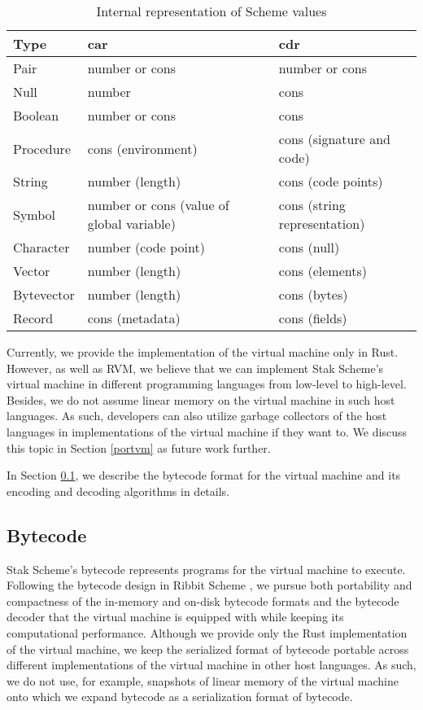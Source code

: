 \documentclass[sigplan]{acmart}
\begin{document}
\begin{table*}
  \begin{center}
    \begin{tabular}{lll}
      \hline
      Type & car & cdr \\
      \hline
      Pair & number or cons & number or cons \\
      Null & number & cons \\
      Boolean & number or cons & cons \\
      Procedure & cons (environment) & cons (signature and code) \\
      String & number (length) & cons (code points) \\
      Symbol & number or cons (value of global variable) & cons
      (string representation) \\
      Character & number (code point) & cons (null) \\
      Vector & number (length) & cons (elements) \\
      Bytevector & number (length) & cons (bytes) \\
      Record & cons (metadata) & cons (fields) \\
      \hline
    \end{tabular}

    \caption{Internal representation of Scheme values}
    \label{table:types}
  \end{center}
\end{table*}

Currently, we provide the implementation of the virtual machine only
in Rust.
However, as well as RVM, we believe that we can implement Stak Scheme's
virtual machine in different programming languages from low-level to high-level.
Besides, we do not assume linear memory on the virtual machine in such
host languages.
As such, developers can also utilize garbage collectors of
the host languages in implementations of the virtual machine if they want to.
We discuss this topic in Section \ref{portvm} as future work further.

In Section \ref{bytecode}, we describe the bytecode format for the
virtual machine and its encoding and decoding algorithms in details.

\subsection{Bytecode} \label{bytecode}

Stak Scheme's bytecode represents programs for the virtual machine to execute.
Following the bytecode design in Ribbit Scheme \cite{ribbit2023}, we pursue both
portability and compactness of the in-memory and on-disk bytecode
formats and the bytecode decoder that the virtual machine is
equipped with while keeping its computational performance.
Although we provide only the Rust implementation of the virtual machine,
we keep the serialized format of bytecode portable across
different implementations of the virtual machine in other host languages.
As such, we do not use, for example, snapshots of linear
memory of the virtual machine onto which we expand bytecode as a
serialization format of bytecode.
\end{document}
